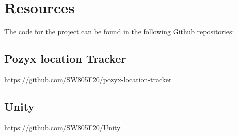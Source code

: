 \chapter*{Resources}
The code for the project can be found in the following Github repositories:

\section*{Pozyx location Tracker}
https://github.com/SW805F20/pozyx-location-tracker

\section*{Unity}
https://github.com/SW805F20/Unity